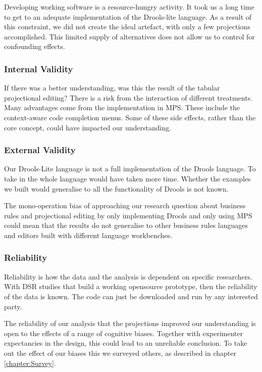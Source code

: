 Developing working software is a resource-hungry activity. 
It took us a long time to get to an adequate implementation of the Drools-lite language.
As a result of this constraint, we did not create the ideal artefact, with only a few projections accomplished.
This limited supply of alternatives does not allow us to control for confounding effects.

\subsubsection{Internal Validity}
If there was a better understanding, was this the result of the tabular projectional editing?
There is a risk from the interaction of different treatments.
Many advantages come from the implementation in MPS.
These include the context-aware code completion menus.
Some of these side effects, rather than the core concept, could have impacted our understanding.

\subsubsection{External Validity}
Our Drools-Lite language is not a full implementation of the Drools language.
To take in the whole language would have taken more time.
Whether the examples we built would generalise to all the functionality of Drools is not known.

The mono-operation bias of approaching our research question about business rules and projectional editing by only implementing Drools and only using MPS could mean that the results do not generalise to other business rules languages and editors built with different language workbenches. 

\subsubsection{Reliability}
Reliability is how the data and the analysis is dependent on specific researchers.
With DSR studies that build a working opensource prototype, then the reliability of the data is known.
The code can just be downloaded and run by any interested party.  

The reliability of our analysis that the projections improved our understanding is open to the effects of a range of cognitive biases. 
Together with experimenter expectancies in the design, this could lead to an unreliable conclusion. 
To take out the effect of our biases this we surveyed others, as described in chapter \ref{chapter:Survey}.
